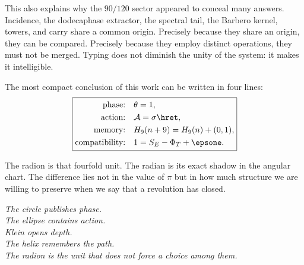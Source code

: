 This also explains why the \(90/120\) sector appeared to conceal many
answers. Incidence, the dodecaphase extractor, the spectral tail, the Barbero
kernel, towers, and carry share a common origin. Precisely because they share an origin,
they can be compared. Precisely because they employ distinct operations, they must not
be merged. Typing does not diminish the unity of the system: it makes it intelligible.

The most compact conclusion of this work can be written in four lines:
\[
\boxed{
\begin{aligned}
\text{phase:}\quad&\theta=1,\\
\text{action:}\quad&\mathcal A=\sigma\hret,\\
\text{memory:}\quad&H_9(n+9)=H_9(n)+(0,1),\\
\text{compatibility:}\quad&1=S_E-\Phi_T+\epsone.
\end{aligned}}
\]

The radion is that fourfold unit. The radian is its exact shadow in the
angular chart. The difference lies not in the value of \(\pi\) but in
how much structure we are willing to preserve when we say that a revolution
has closed.

\vspace{2\baselineskip}
\begin{center}
\begin{minipage}{.82\textwidth}
\centering\large\itshape\color{RadNavy}
The circle publishes phase.\\
The ellipse contains action.\\
Klein opens depth.\\
The helix remembers the path.\\[.7em]
The radion is the unit that does not force a choice among them.
\end{minipage}
\end{center}

